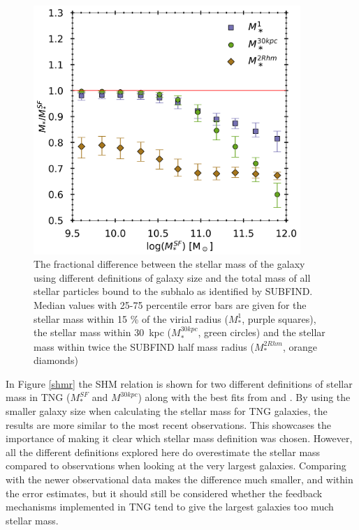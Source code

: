 \begin{figure}
    \centering
    \includegraphics[width=0.9\textwidth]{images/SM_fSM.png}
    \caption{The fractional difference between the stellar mass of the galaxy using different definitions of galaxy size and the total mass of all stellar particles bound to the subhalo as identified by SUBFIND. Median values with 25-75 percentile error bars are given for the stellar mass within 15 \% of the virial radius ($M_\ast^1$, purple squares), the stellar mass within 30$\,$ kpc ($M_\ast^{30kpc}$, green circles) and the stellar mass within twice the SUBFIND half mass radius ($M_\ast^{2Rhm}$, orange diamonds)}
    \label{SM_fSM}
\end{figure}


In Figure \ref{shmr} the SHM relation is shown for two different definitions of stellar mass in TNG ($M^{SF}_\ast$ and $M^{30kpc}$) along with the best fits from \textcite{Behroozi2013} and \textcite{Zanisi2019}. By using the smaller galaxy size when calculating the stellar mass for TNG galaxies, the results are more similar to the most recent observations. This showcases the importance of making it clear which stellar mass definition was chosen. However, all the different definitions explored here do overestimate the stellar mass compared to observations when looking at the very largest galaxies. Comparing with the newer observational data makes the difference much smaller, and within the error estimates, but it should still be considered whether the feedback mechanisms implemented in TNG tend to give the largest galaxies too much stellar mass. 

